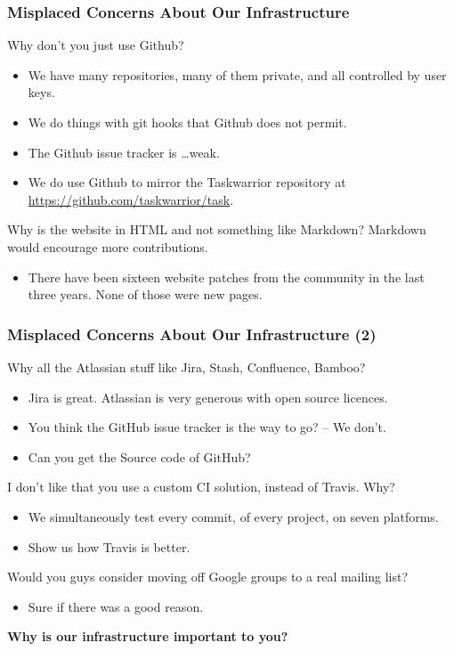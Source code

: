 \documentclass[t,handout]{beamer}
\begin{document}
\begin{frame}[fragile]\frametitle{Misplaced Concerns About Our Infrastructure}
    Why don't you just use Github?
    \begin{itemize}
        \item We have many repositories, many of them private, and all controlled by user keys.
        \item We do things with git hooks that Github does not permit.
        \item The Github issue tracker is \ldots weak.
        \item We do use Github to mirror the Taskwarrior repository at \href{https://github.com/taskwarrior/task}{https://github.com/taskwarrior/task}.
    \end{itemize}

    Why is the website in HTML and not something like Markdown? Markdown would encourage more contributions.
    \begin{itemize}
        \item There have been sixteen website patches from the community in the last three years. None of those were new pages.
    \end{itemize}
\end{frame}

\begin{frame}[fragile]\frametitle{Misplaced Concerns About Our Infrastructure (2)}
    Why all the Atlassian stuff like Jira, Stash, Confluence, Bamboo?
    \begin{itemize}
        \item Jira is great. Atlassian is very generous with open source licences.
        \item You think the GitHub issue tracker is the way to go? -- We don't.
        \item Can you get the Source code of GitHub?
    \end{itemize}

    I don't like that you use a custom CI solution, instead of Travis. Why?
    \begin{itemize}
        \item We simultaneously test every commit, of every project, on seven platforms.
        \item Show us how Travis is better.
    \end{itemize}

    Would you guys consider moving off Google groups to a real mailing list?
    \begin{itemize}
        \item Sure if there was a good reason.
    \end{itemize}

    \textbf{Why is our infrastructure important to you?}
\end{frame}
\end{document}
